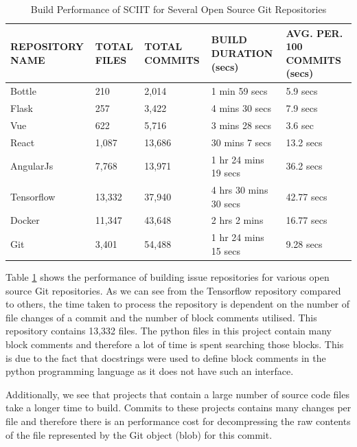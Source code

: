 \documentclass{mproj}
\begin{document}
\begin{table}[h!]
\centering
  \caption{Build Performance of SCIIT for Several Open Source Git Repositories}
  \label{table:build-performance}
  \begin{tabular}{ | p{3cm} | p{3cm} | p{3cm} | p{3cm} | p{3cm} }

    \hline
    \textbf{REPOSITORY NAME} & \textbf{TOTAL FILES} & \textbf{TOTAL COMMITS} & \textbf{BUILD DURATION (secs)}  & \textbf{AVG. PER. 100 COMMITS (secs)} \\ \hline
    Bottle & 210 & 2,014 & 1 min 59 secs & 5.9 secs \\ \hline
    Flask & 257 & 3,422 & 4 mins 30 secs & 7.9 secs \\ \hline
    Vue & 622 & 5,716 & 3 mins 28 secs & 3.6 sec \\ \hline
    React & 1,087 & 13,686 & 30 mins 7 secs & 13.2 secs \\ \hline
    AngularJs & 7,768 & 13,971 &  1 hr 24 mins 19 secs & 36.2 secs \\ \hline
    Tensorflow & 13,332 & 37,940 & 4 hrs 30 mins 30 secs & 42.77 secs \\ \hline
    Docker & 11,347 & 43,648 & 2 hrs 2 mins & 16.77 secs \\ \hline
    Git & 3,401 & 54,488 & 1 hr 24 mins 15 secs & 9.28 secs \\ \hline

  \end{tabular}
\end{table}

Table \ref{table:build-performance} shows the performance of building issue repositories for various open source Git repositories. As we can see from the Tensorflow repository compared to others, the time taken to process the repository is dependent on the number of file changes of a commit and the number of block comments utilised. This repository contains 13,332 files. The python files in this project contain many block comments and therefore a lot of time is spent searching those blocks. This is due to the fact that docstrings were used to define block comments in the python programming language as it does not have such an interface.

Additionally, we see that projects that contain a large number of source code files take a longer time to build. Commits to these projects contains many changes per file and therefore there is an performance cost for decompressing the raw contents of the file represented by the Git object (blob) for this commit. 
\end{document}
